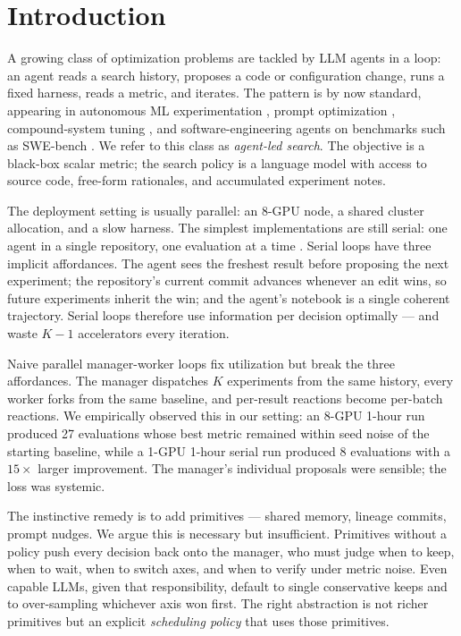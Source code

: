 \documentclass{article}
\begin{document}
\section{Introduction}
\label{sec:intro}

A growing class of optimization problems are tackled by LLM agents in a loop: an agent reads a search history, proposes a code or configuration change, runs a fixed harness, reads a metric, and iterates. The pattern is by now standard, appearing in autonomous ML experimentation \citep{karpathy_autoresearch}, prompt optimization \citep{yang2023opro,promptagent}, compound-system tuning \citep{textgrad,dspy}, and software-engineering agents on benchmarks such as SWE-bench \citep{swebench}. We refer to this class as \emph{agent-led search}. The objective is a black-box scalar metric; the search policy is a language model with access to source code, free-form rationales, and accumulated experiment notes.

The deployment setting is usually parallel: an 8-GPU node, a shared cluster allocation, and a slow harness. The simplest implementations are still serial: one agent in a single repository, one evaluation at a time \citep{karpathy_autoresearch}. Serial loops have three implicit affordances. The agent sees the freshest result before proposing the next experiment; the repository's current commit advances whenever an edit wins, so future experiments inherit the win; and the agent's notebook is a single coherent trajectory. Serial loops therefore use information per decision optimally — and waste $K-1$ accelerators every iteration.

Naive parallel manager-worker loops fix utilization but break the three affordances. The manager dispatches $K$ experiments from the same history, every worker forks from the same baseline, and per-result reactions become per-batch reactions. We empirically observed this in our setting: an 8-GPU 1-hour run produced 27 evaluations whose best metric remained within seed noise of the starting baseline, while a 1-GPU 1-hour serial run produced 8 evaluations with a $15\times$ larger improvement. The manager's individual proposals were sensible; the loss was systemic.

The instinctive remedy is to add primitives — shared memory, lineage commits, prompt nudges. We argue this is necessary but insufficient. Primitives without a policy push every decision back onto the manager, who must judge when to keep, when to wait, when to switch axes, and when to verify under metric noise. Even capable LLMs, given that responsibility, default to single conservative keeps and to over-sampling whichever axis won first. The right abstraction is not richer primitives but an explicit \emph{scheduling policy} that uses those primitives.
\end{document}
